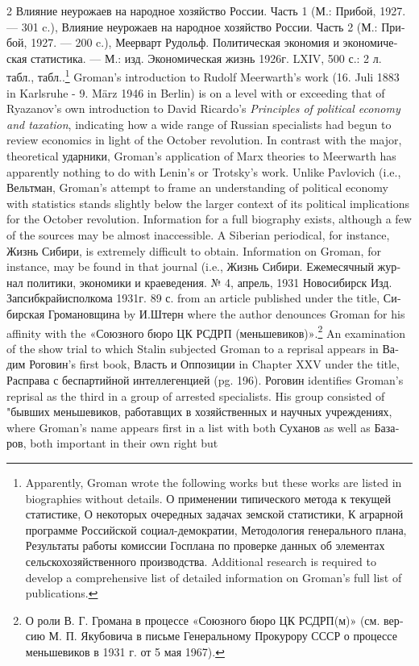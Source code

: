 \documentclass[10pt,a4paper,twoside]{article} %
\begin{document}
\begin{multicols}{2}
{\textrussian{Влияние неурожаев на народное хозяйство России. Часть 1} (\textrussian{М.: Прибой, 1927. — 301 c.}), \textrussian{Влияние неурожаев на народное хозяйство России. Часть 2} (\textrussian{М.: Прибой, 1927. — 200 c.}), \textrussian{Меерварт Рудольф. Политическая экономия и экономическая статистика. — М.: изд. Экономическая жизнь 1926г. LXIV, 500 с.: 2 л. табл., табл.}.\footnote{Apparently, Groman wrote the following works but these works are listed in biographies without details. \textrussian{О применении типического метода к текущей статистике}, \textrussian{ О некоторых очередных задачах земской статистики}, \textrussian{К аграрной программе Российской социал-демократии}, \textrussian{Методология генерального плана}, \textrussian{Результаты работы комиссии Госплана по проверке данных об элементах сельскохозяйственного производства}. Additional research is required to develop a comprehensive list of detailed information on Groman's full list of publications.} Groman's introduction to Rudolf Meerwarth's work (\textgerman{16. Juli 1883 in Karlsruhe - 9. März 1946 in Berlin}) is on a level with or exceeding that of Ryazanov's own introduction to David Ricardo's \textenglish{\emph{Principles of political economy and taxation}}, indicating how a wide range of Russian specialists had begun to review economics in light of the October revolution. In contrast with the major, theoretical \textrussian{ударники}, Groman's application of Marx theories to Meerwarth has apparently nothing to do with Lenin's or Trotsky's work. Unlike Pavlovich (i.e., \textrussian{Вельтман}, Groman's attempt to frame an understanding of political economy with statistics stands slightly below the larger context of its political implications for the October revolution.  \newline \indent Information for a full biography exists, although a few of the sources may be almost inaccessible. A Siberian periodical, for instance, \textrussian{Жизнь Сибири}, is extremely difficult to obtain. Information on Groman, for instance, may be found in that journal (i.e., \textrussian{Жизнь Сибири. Ежемесячный журнал политики, экономики и краеведения. № 4, апрель, 1931 Новосибирск Изд. Запсибкрайисполкома 1931г. 89 с.} from an article published under the title, \textrussian{Сибирская Громановщина} by \textrussian{И.Штерн} where the author denounces Groman for his affinity with the \textrussian{«Союзного бюро ЦК РСДРП (меньшевиков)»}.\footnote{\textrussian{О роли В. Г. Громана в процессе «Союзного бюро ЦК РСДРП(м)» (см. версию М. П. Якубовича в письме Генеральному Прокурору СССР о процессе меньшевиков в 1931 г. от 5 мая 1967)}.} An examination of the show trial to which Stalin subjected Groman to a reprisal appears in \textrussian{Вадим Роговин}'s first book, \textrussian{Власть и Оппозиции} in Chapter XXV under the title, \textrussian{Расправа с беспартийной интеллегенцией} (pg. 196). \textrussian{Роговин} identifies Groman's reprisal as the third in a group of arrested specialists. His group consisted of "\textrussian{бывших меньшевиков, работавщих в хозяйственных и научных учреждениях}, where Groman's name appears first in a list with both \textrussian{Суханов} as well as \textrussian{Базаров}, both important in their own right but }
\end{multicols}
\end{document}
